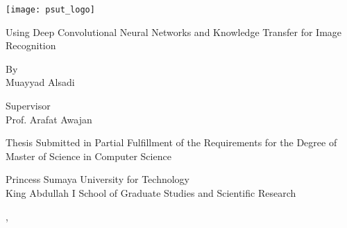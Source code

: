 \begin{titlepage}
\singlespacing
\centering
\bfseries
\vspace{24pt}
{\texttt{[image: psut\_logo]}\par}
\vspace{24pt}
{\fontsize{24pt}{36pt}\selectfont Using Deep Convolutional Neural Networks and Knowledge Transfer for Image Recognition \par}
\vspace{24pt}
{\fontsize{16pt}{24pt}\selectfont
By\\
Muayyad Alsadi\par}
\vspace{36pt}
{\fontsize{16pt}{24pt}\selectfont
Supervisor\\
Prof. Arafat Awajan\par}
\vspace{24pt}
{\fontsize{14pt}{21pt}\selectfont
Thesis Submitted in Partial Fulfillment of the Requirements for the
Degree of Master of Science in Computer Science\par}
\vspace{24pt}
{\fontsize{16pt}{24pt}\selectfont
Princess Sumaya University for Technology\\
King Abdullah I School of Graduate Studies and Scientific Research\par}
\vspace{24pt}
\vfill
{\fontsize{16pt}{24pt}\selectfont\monthname, \the\year \par}
\onehalfspacing
\end{titlepage}

